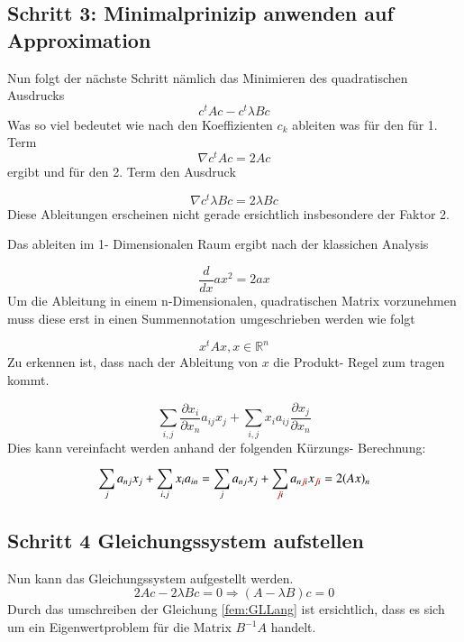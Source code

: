 \subsection{Schritt 3: Minimalprinizip anwenden auf Approximation}

Nun folgt der nächste Schritt nämlich das Minimieren des quadratischen Ausdrucks
\begin{equation}
	c^t Ac - c^t \lambda Bc
\end{equation}
Was so viel bedeutet wie nach den Koeffizienten $c_k$ ableiten was für den  für 1. Term
\begin{equation}
	\nabla c^t Ac = 2Ac
\end{equation}
ergibt und für den 2. Term den Ausdruck

\begin{equation}
	\nabla c^t \lambda Bc = 2\lambda Bc
\end{equation}
Diese Ableitungen erscheinen nicht gerade ersichtlich insbesondere der Faktor 2. 

Das ableiten im 1- Dimensionalen Raum ergibt nach der klassichen Analysis

\begin{equation}
	\frac{d}{dx} ax^2 = 2ax
\end{equation}
Um die Ableitung in einem n-Dimensionalen, quadratischen Matrix vorzunehmen muss diese erst in einen Summennotation umgeschrieben werden wie folgt

\begin{equation}
			x^tAx, x \in \mathbb{R}^n
\end{equation}
Zu erkennen ist, dass nach der Ableitung von $x$ die Produkt- Regel zum tragen kommt. 

\begin{equation}
	\sum_{i,j} \frac{\partial x_i}{\partial x_n} a_{ij} x_j + \sum_{i,j} x_i a_{ij} \frac{\partial x_j}{\partial x_n}
\end{equation}
Dies kann vereinfacht werden anhand der folgenden Kürzungs- Berechnung:

\begin{equation}
	\sum_{j} a_{nj} x_j + \sum_{i,j} x_i a_{in} = \sum_{j} a_{nj} x_j + \sum_{\textcolor{red}{\not{j}} i} a_{n \textcolor{red}{\not{j}} i} x_{\textcolor{red}{\not{j}} i} = 2(Ax)_n
\end{equation}

\subsection{Schritt 4 Gleichungssystem aufstellen}
Nun kann das Gleichungssystem aufgestellt werden.
\begin{equation}
	2Ac - 2\lambda Bc = 0 \Rightarrow (A-\lambda B)c = 0
	\label{fem:GLLang}
\end{equation}
Durch das umschreiben der Gleichung \ref{fem:GLLang} ist ersichtlich, dass es sich um ein Eigenwertproblem für die Matrix $B^{-1}A$ handelt.

